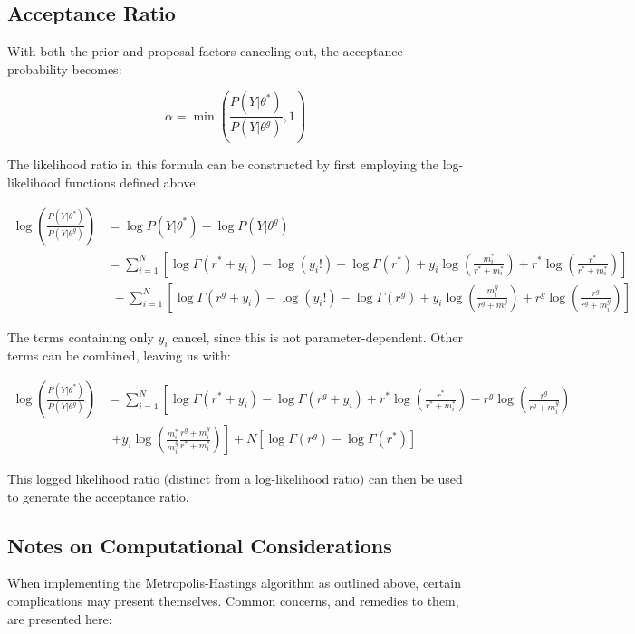 \documentclass[12pt]{article}
\begin{document}
	\subsection{Acceptance Ratio}
	With both the prior and proposal factors canceling out, the acceptance probability becomes:
	
	\begin{equation}
		\alpha = \min\left( \frac{P(Y|\theta^*)}{P(Y|\theta^g)},1\right)
	\end{equation}
	
	The likelihood ratio in this formula can be constructed by first employing the log-likelihood functions defined above:
	
	\begin{align*}
	\log\left( \frac{P(Y|\theta^*)}{P(Y|\theta^g)} \right) &= \log P(Y|\theta^*) - \log P(Y|\theta^g)\\
	&= \sum_{i = 1}^{N} \left[\log \Gamma(r^* + y_i) - \log(y_i!) - \log \Gamma(r^*) + y_i \log\left(\frac{m_i^*}{r^* + m_i^*}\right) + r^* \log\left(\frac{r^*}{r^* + m_i^*}\right)\right] \\&~~- \sum_{i = 1}^{N} \left[\log \Gamma(r^g + y_i) - \log(y_i!) - \log \Gamma(r^g) + y_i \log\left(\frac{m_i^g}{r^g + m_i^g}\right) + r^g \log(\frac{r^g}{r^g + m_i^g})\right]
	\end{align*}
	
	The terms containing only $y_i$ cancel, since this is not parameter-dependent. Other terms can be combined, leaving us with:
	
	\begin{align*}
	\log\left( \frac{P(Y|\theta^*)}{P(Y|\theta^g)} \right) &= \sum_{i = 1}^{N} \left[\log\Gamma(r^* + y_i) - \log\Gamma(r^g + y_i) + r^* \log\left(\frac{r^*}{r^* + m_i^*}\right) - r^g \log\left(\frac{r^g}{r^g + m_i^g}\right)\right.\\&~~ \left.+ y_i\log\left(\frac{m_i^*}{m_i^g}\frac{r^g + m_i^g}{r^* + m_i^*}\right)\right] + N\left[\log\Gamma(r^g) - \log\Gamma(r^*)\right]
	\end{align*}
	
	This logged likelihood ratio (distinct from a log-likelihood ratio) can then be used to generate the acceptance ratio.
	
	\subsection{Notes on Computational Considerations}
	When implementing the Metropolis-Hastings algorithm as outlined above, certain complications may present themselves. Common concerns, and remedies to them, are presented here:
	
\end{document}
